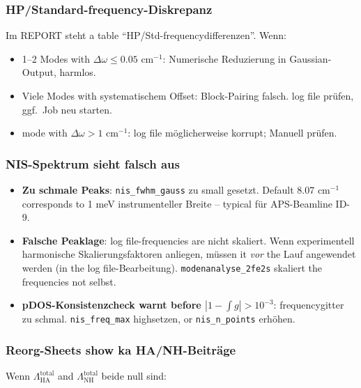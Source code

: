 \documentclass[11pt,a4paper,twoside]{article}
\theoremstyle{remark}
\begin{document}
\subsubsection*{HP/Standard-frequency-Diskrepanz}

Im REPORT steht a table ``HP/Std-frequencydifferenzen''. Wenn:

\begin{itemize}
  \item 1--2 Modes with $\Delta\omega \leq 0.05$ cm$^{-1}$:
        Numerische Reduzierung in Gaussian-Output, harmlos.
  \item Viele Modes with systematischem Offset:
        Block-Pairing falsch. log file pr\"ufen, ggf.\ Job neu starten.
  \item mode with $\Delta\omega > 1$ cm$^{-1}$:
        log file m\"oglicherweise korrupt; Manuell pr\"ufen.
\end{itemize}

\subsubsection*{NIS-Spektrum sieht falsch aus}

\begin{itemize}
  \item \textbf{Zu schmale Peaks}: \texttt{nis\_fwhm\_gauss} zu small
        gesetzt. Default 8.07 cm$^{-1}$ corresponds to 1 meV instrumenteller
        Breite -- typical f\"ur APS-Beamline ID-9.
  \item \textbf{Falsche Peaklage}: log file-frequencies are nicht
        skaliert. Wenn experimentell harmonische Skalierungsfaktoren
        anliegen, m\"ussen it \emph{vor} the Lauf angewendet werden
        (in the log file-Bearbeitung). \texttt{modenanalyse\_2fe2s}
        skaliert the frequencies not selbst.
  \item \textbf{pDOS-Konsistenzcheck warnt before $|1 - \int g|>10^{-3}$}:
        frequencygitter zu schmal. \texttt{nis\_freq\_max} highsetzen,
        or \texttt{nis\_n\_points} erh\"ohen.
\end{itemize}

\subsubsection*{Reorg-Sheets show ka HA/NH-Beitr\"age}

Wenn $\Lambda_\text{HA}^\text{total}$ and $\Lambda_\text{NH}^\text{total}$
beide null sind:
\end{document}
